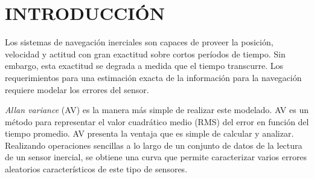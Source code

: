 \documentclass[a4paper,11pt,twoside]{IT-CNEA}
\begin{document}
    \tableofcontents       
    \printnomenclature[2cm]

\clearpage  
\newpage
\section{INTRODUCCIÓN}
Los sistemas de navegación inerciales son capaces de proveer la posición, velocidad y actitud con
gran exactitud sobre cortos períodos de tiempo. Sin embargo, esta exactitud se degrada a medida que el
tiempo transcurre. Los requerimientos para una estimación exacta de la información para la navegación
requiere modelar los errores del sensor.
\par \textit{Allan variance} (AV) es la manera más simple de realizar este modelado. AV es un método para
representar el valor cuadrático medio (RMS) del error en función del tiempo promedio.
AV presenta la ventaja que es simple de calcular y analizar. Realizando operaciones sencillas a lo largo
de un conjunto de datos de la lectura de un sensor inercial, se obtiene una curva que permite caracterizar varios
errores aleatorios característicos de este tipo de sensores.
\clearpage
\newpage
\end{document}
